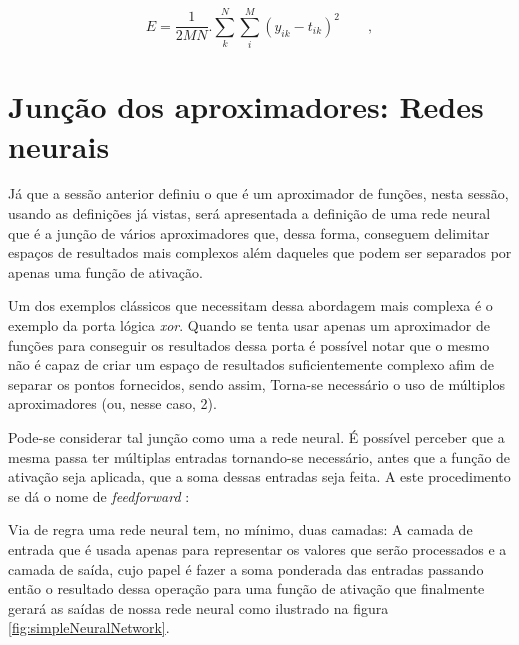 \begin{apendicesenv}
		
		\begin{equation}
			E = \dfrac{1}{2MN} . \sum_{k}^{N}\sum_{i}^{M}(y_{ik}-t_{ik})^2 \qquad,
			\label{eq:batchError}
		\end{equation}
		
	\section{Junção dos aproximadores: Redes neurais }
		\par Já que a sessão anterior definiu o que é um aproximador de funções, nesta sessão, usando as definições já vistas, será apresentada a definição de uma rede neural que é a junção de vários aproximadores que, dessa forma, conseguem  delimitar espaços de resultados mais complexos além daqueles que podem ser separados por apenas uma função de ativação.
		
		\par Um dos exemplos clássicos que necessitam dessa abordagem mais complexa é o exemplo da porta lógica \textit{xor}. Quando se tenta usar apenas um aproximador de funções para conseguir os resultados dessa porta é possível notar que o mesmo não é capaz de criar um espaço de resultados suficientemente complexo afim de separar os pontos fornecidos, sendo assim, Torna-se necessário o uso de múltiplos aproximadores (ou, nesse caso, 2).
		
		\par Pode-se considerar tal junção como uma a rede neural. É possível perceber que a mesma passa ter múltiplas entradas tornando-se necessário, antes que a função de ativação seja aplicada, que a soma dessas entradas seja feita. A este procedimento se dá o nome de \textit{feedforward} \cite{haykinredes}:
		
		\par Via de regra uma rede neural tem, no mínimo, duas camadas: A camada de entrada que é usada apenas para representar os valores que serão processados e a camada de saída, cujo papel é fazer a soma ponderada das entradas passando então o resultado dessa operação para uma função de ativação que finalmente gerará as saídas de nossa rede neural como ilustrado na figura \ref{fig:simpleNeuralNetwork}.
		

\end{apendicesenv}
